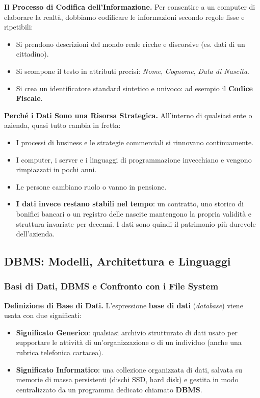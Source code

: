 \documentclass[12pt]{extarticle}
\begin{document}
\medskip
\noindent \textbf{Il Processo di Codifica dell'Informazione.} Per consentire a un computer di elaborare la realtà, dobbiamo codificare le informazioni secondo regole fisse e ripetibili:
\begin{itemize}
    \item Si prendono descrizioni del mondo reale ricche e discorsive (es. dati di un cittadino).
    \item Si scompone il testo in attributi precisi: \textit{Nome}, \textit{Cognome}, \textit{Data di Nascita}.
    \item Si crea un identificatore standard sintetico e univoco: ad esempio il \textbf{Codice Fiscale}.
\end{itemize}

\medskip
\noindent \textbf{Perché i Dati Sono una Risorsa Strategica.} All'interno di qualsiasi ente o azienda, quasi tutto cambia in fretta:
\begin{itemize}
    \item I processi di business e le strategie commerciali si rinnovano continuamente.
    \item I computer, i server e i linguaggi di programmazione invecchiano e vengono rimpiazzati in pochi anni.
    \item Le persone cambiano ruolo o vanno in pensione.
    \item \textbf{I dati invece restano stabili nel tempo}: un contratto, uno storico di bonifici bancari o un registro delle nascite mantengono la propria validità e struttura invariate per decenni. I dati sono quindi il patrimonio più durevole dell'azienda.
\end{itemize}

\subsection{DBMS: Modelli, Architettura e Linguaggi}
\subsubsection{Basi di Dati, DBMS e Confronto con i File System}
\noindent \textbf{Definizione di Base di Dati.} L'espressione \textbf{base di dati} (\textit{database}) viene usata con due significati:
\begin{itemize}
    \item \textbf{Significato Generico}: qualsiasi archivio strutturato di dati usato per supportare le attività di un'organizzazione o di un individuo (anche una rubrica telefonica cartacea).
    \item \textbf{Significato Informatico}: una collezione organizzata di dati, salvata su memorie di massa persistenti (dischi SSD, hard disk) e gestita in modo centralizzato da un programma dedicato chiamato \textbf{DBMS}.
\end{itemize}
\end{document}

